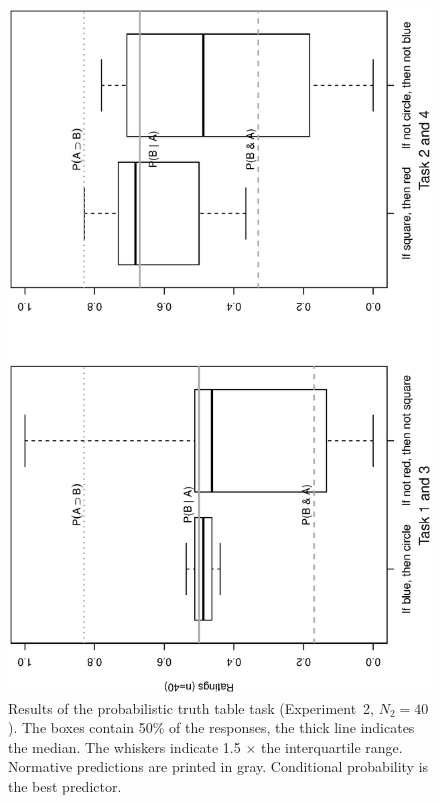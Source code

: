 \documentclass[11pt]{article}
\begin{document}
~

 \newpage

~



\begin{figure}
\begin{center}
\includegraphics[angle=270,width=.85\textwidth]{atpt.eps}
\caption{\label{ptttexp2}Results of the probabilistic truth table task
  (Experiment~2, $N_2=40$).  The boxes contain 50\% of the responses, the thick
  line indicates the median. The whiskers indicate 1.5 $\times$ the
  interquartile range. Normative predictions are printed in
  gray. Conditional probability is the best predictor.}

\end{center}
\end{figure}
\end{document}
